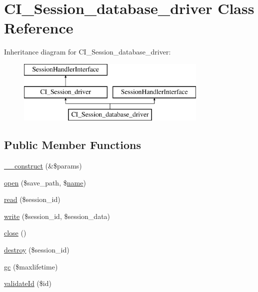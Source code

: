 \hypertarget{class_c_i___session__database__driver}{}\section{C\+I\+\_\+\+Session\+\_\+database\+\_\+driver Class Reference}
\label{class_c_i___session__database__driver}
Inheritance diagram for C\+I\+\_\+\+Session\+\_\+database\+\_\+driver\+:\begin{figure}[H]
\begin{center}
\leavevmode
\includegraphics[height=3.000000cm]{class_c_i___session__database__driver}
\end{center}
\end{figure}
\subsection*{Public Member Functions}
\begin{DoxyCompactItemize}
\item 
\mbox{\hyperlink{class_c_i___session__database__driver_ac1669c73d53d6f16cf5459a1e84d39c8}{\+\_\+\+\_\+construct}} (\&\$params)
\item 
\mbox{\hyperlink{class_c_i___session__database__driver_a614b5cf3840833913c7a73260ed28e02}{open}} (\$save\+\_\+path, \$\mbox{\hyperlink{waiter_2order_8php_afb270cde4944e425a37cf277116a7f43}{name}})
\item 
\mbox{\hyperlink{class_c_i___session__database__driver_a5bbf84ebf657be4eaccc0582377c76bf}{read}} (\$session\+\_\+id)
\item 
\mbox{\hyperlink{class_c_i___session__database__driver_ad9d124885be93668f1dbf6aace5964f5}{write}} (\$session\+\_\+id, \$session\+\_\+data)
\item 
\mbox{\hyperlink{class_c_i___session__database__driver_aa69c8bf1f1dcf4e72552efff1fe3e87e}{close}} ()
\item 
\mbox{\hyperlink{class_c_i___session__database__driver_aaec5812f6b4eb6835f88d3baa06a002a}{destroy}} (\$session\+\_\+id)
\item 
\mbox{\hyperlink{class_c_i___session__database__driver_a57aff7ee0656d8aa75d545fb8b3ae35d}{gc}} (\$maxlifetime)
\item 
\mbox{\hyperlink{class_c_i___session__database__driver_a4a58e8f59b2accc199bbebd5ee52bc74}{validate\+Id}} (\$id)
\end{DoxyCompactItemize}
